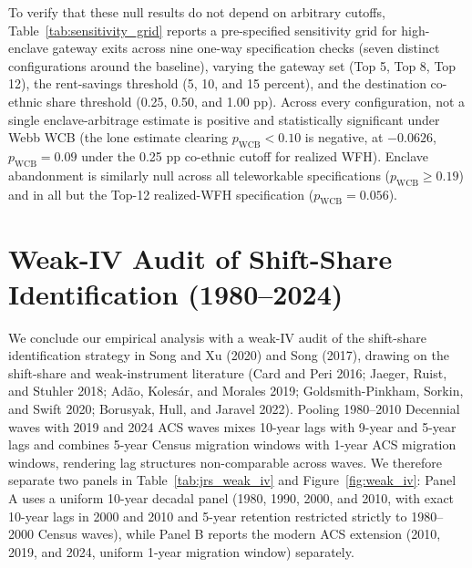 \documentclass[11pt]{article}
\begin{document}
To verify that these null results do not depend on arbitrary cutoffs, Table~\ref{tab:sensitivity_grid} reports a pre-specified sensitivity grid for high-enclave gateway exits across nine one-way specification checks (seven distinct configurations around the baseline), varying the gateway set (Top 5, Top 8, Top 12), the rent-savings threshold (5, 10, and 15 percent), and the destination co-ethnic share threshold (0.25, 0.50, and 1.00 pp). Across every configuration, not a single enclave-arbitrage estimate is positive and statistically significant under Webb WCB (the lone estimate clearing $p_{\text{WCB}} < 0.10$ is negative, at $-0.0626$, $p_{\text{WCB}} = 0.09$ under the 0.25 pp co-ethnic cutoff for realized WFH). Enclave abandonment is similarly null across all teleworkable specifications ($p_{\text{WCB}} \ge 0.19$) and in all but the Top-12 realized-WFH specification ($p_{\text{WCB}} = 0.056$).



\section{Weak-IV Audit of Shift-Share Identification (1980--2024)}

We conclude our empirical analysis with a weak-IV audit of the shift-share identification strategy in Song and Xu (2020) and Song (2017), drawing on the shift-share and weak-instrument literature (Card and Peri 2016; Jaeger, Ruist, and Stuhler 2018; Ad\~{a}o, Koles\'{a}r, and Morales 2019; Goldsmith-Pinkham, Sorkin, and Swift 2020; Borusyak, Hull, and Jaravel 2022). Pooling 1980--2010 Decennial waves with 2019 and 2024 ACS waves mixes 10-year lags with 9-year and 5-year lags and combines 5-year Census migration windows with 1-year ACS migration windows, rendering lag structures non-comparable across waves. We therefore separate two panels in Table~\ref{tab:jrs_weak_iv} and Figure~\ref{fig:weak_iv}: Panel A uses a uniform 10-year decadal panel (1980, 1990, 2000, and 2010, with exact 10-year lags in 2000 and 2010 and 5-year retention restricted strictly to 1980--2000 Census waves), while Panel B reports the modern ACS extension (2010, 2019, and 2024, uniform 1-year migration window) separately.
\end{document}
